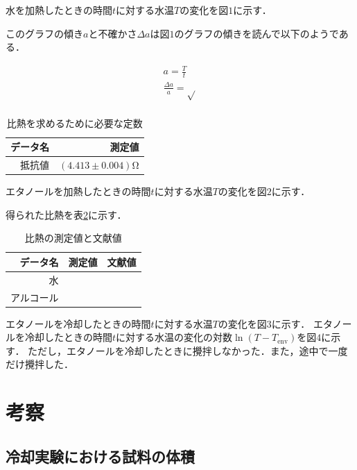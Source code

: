 \documentclass[uplatex,dvipdfmx,a4paper,10pt]{jsarticle}
\begin{document}
水を加熱したときの時間$t$に対する水温$T$の変化を図$1$に示す．

このグラフの傾き$a$と不確かさ$\Delta a$は図$1$のグラフの傾きを読んで以下のようである．

\begin{align}
    a = \frac{T}{t}\\
    \frac{\Delta a}{a} = \sqrt{}\\
\end{align}

\begin{table}[htbp]
    \begin{center}
        \caption{比熱を求めるために必要な定数}%
        \label{tb:const}
        \begin{tabular}{r|r}
            \hline
            データ名 & 測定値\\
            \hline
            抵抗値 & $(4.413 \pm 0.004)\mathrm{Ω}$\\
            \hline
        \end{tabular}
    \end{center}
\end{table}

エタノールを加熱したときの時間$t$に対する水温$T$の変化を図$2$に示す．

得られた比熱を表\ref{tb:heatcap}に示す．
\begin{table}[htbp]
    \begin{center}
        \caption{比熱の測定値と文献値}
        \label{tb:heatcap}
        \begin{tabular}{r|rr}
            \hline
            データ名 & 測定値 & 文献値\\
            \hline
            水 &  & \\
            アルコール & & \\
            \hline
        \end{tabular}
    \end{center}
\end{table}

エタノールを冷却したときの時間$t$に対する水温$T$の変化を図$3$に示す．
エタノールを冷却したときの時間$t$に対する水温の変化の対数$\ln(T-T_\mathrm{env})$を図$4$に示す．
ただし，エタノールを冷却したときに攪拌しなかった．また，途中で一度だけ攪拌した．

\section{考察}
\subsection{冷却実験における試料の体積}
\end{document}
